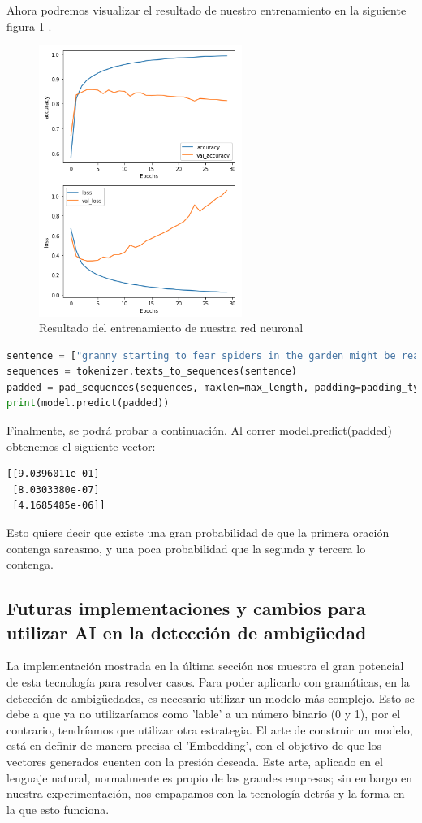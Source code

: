 Ahora podremos visualizar el resultado de nuestro entrenamiento en la siguiente figura \ref{fig:AI} .
\begin{figure}[h!]
    \centering
    \includegraphics[width=250px]{img/AI/g.png}
    \caption{Resultado del entrenamiento de nuestra red neuronal}
    \label{fig:AI}
\end{figure} 

\begin{lstlisting}[style= mystyle, language=Python]
sentence = ["granny starting to fear spiders in the garden might be real", "game of thrones season finale showing this sunday night"]
sequences = tokenizer.texts_to_sequences(sentence)
padded = pad_sequences(sequences, maxlen=max_length, padding=padding_type, truncating=trunc_type)
print(model.predict(padded))
\end{lstlisting}

Finalmente, se podrá probar a continuación. Al correr model.predict(padded) obtenemos el siguiente vector: 
\begin{lstlisting}
[[9.0396011e-01]
 [8.0303380e-07]
 [4.1685485e-06]]\end{lstlisting}
 
 Esto quiere decir que existe una gran probabilidad de que la primera oración contenga sarcasmo, y una poca probabilidad que la segunda y tercera lo contenga.
 
 
\subsection{Futuras implementaciones y cambios para utilizar AI en la detección de ambigüedad}

La implementación mostrada en la última sección nos muestra el gran potencial de esta tecnología para resolver casos. Para poder aplicarlo con gramáticas, en la detección de ambigüedades, es necesario utilizar un modelo más complejo. Esto se debe a que ya no utilizaríamos como 'lable' a un número binario (0 y 1), por el contrario, tendríamos que utilizar otra estrategia. El arte de construir un modelo, está en definir de manera precisa el 'Embedding', con el objetivo de que los vectores generados cuenten con la presión deseada. Este arte, aplicado en el lenguaje natural, normalmente es propio de las grandes empresas; sin embargo en nuestra experimentación, nos empapamos con la tecnología detrás y la forma en la que esto funciona.
